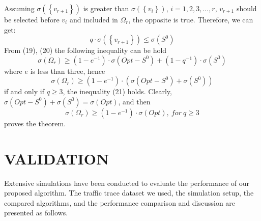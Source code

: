 \documentclass[journal]{IEEEtran}
\begin{document}
Assuming $\sigma\left(\left \{ v_{r+1} \right \}\right)$ is greater than $\sigma\left ( \left \{ v_{i} \right \} \right)$, $i=1,2,3,...,r$, $v_{r+1}$ should be selected before $v_{i}$ and included in $\Omega _{r}$, the opposite is true. Therefore, we can get:
\begin{equation}
q\cdot \sigma \left ( \left \{ v_{r+1} \right \} \right )\leqslant \sigma \left ( S^{0} \right )
\end{equation}
From (19), (20) the following inequality can be hold
\begin{equation}
\sigma \left ( \Omega _{r} \right )\geqslant \left ( 1-e^{-1} \right )\cdot \sigma (Opt-S^{0})+(1-q^{-1})\cdot \sigma (S^{0})
\end{equation}
where $e$ is less than three, hence
\begin{equation}
\sigma \left ( \Omega _{r} \right )\geqslant \left ( 1-e^{-1} \right )\cdot (\sigma (Opt-S^{0})+\sigma (S^{0}))
\end{equation}
if and only if $q\geqslant 3$, the inequality (21) holds. Clearly, $\sigma(Opt-S^{0})+\sigma (S^{0})=\sigma (Opt)$, and then
\begin{equation}
\sigma(\Omega_{r})\geqslant (1-e^{-1})\cdot \sigma(Opt), \ for \ q\geqslant 3
\end{equation}
proves the theorem.


\section{VALIDATION}
Extensive simulations have been conducted to evaluate the performance of our proposed algorithm. The traffic trace dataset we used, the simulation setup, the compared algorithms, and the performance comparison and discussion are presented as follows.
\end{document}
